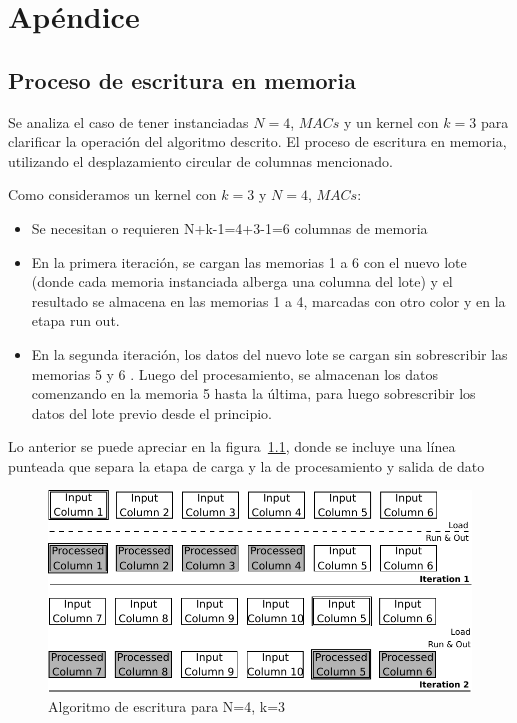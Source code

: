 \chapter{Apéndice}
\section{Proceso de escritura en memoria}  \label{writing_subsecc}

Se analiza el caso de tener instanciadas $N=4$, $MACs$ y un kernel con $k=3$
para clarificar la operación del algoritmo descrito. El proceso de escritura en
memoria, utilizando el desplazamiento circular de columnas mencionado.

Como consideramos un kernel con $k=3$ y $N=4$, $MACs$:
	    
\begin{itemize}
\item Se necesitan o requieren N+k-1=4+3-1=6 columnas de memoria
\item En la primera iteración, se cargan las memorias 1 a 6 con el nuevo lote
  (donde cada memoria instanciada alberga una columna del lote) y el resultado
  se almacena en las memorias 1 a 4, marcadas con otro color y en la etapa run
  out.
\item En la segunda iteración, los datos del nuevo lote se cargan sin
  sobrescribir las memorias 5 y 6 . Luego del procesamiento, se almacenan los
  datos comenzando en la memoria  5 hasta la última, para luego sobrescribir los
  datos del lote previo desde el principio.
\end{itemize}

Lo anterior se puede apreciar en la figura~\ref{writingprocess1}, donde se
incluye una línea punteada que separa la etapa de carga y la de procesamiento y
salida de dato

\begin{figure}
\centering
\includegraphics[scale=0.8]{algorithm}
\caption{Algoritmo de escritura para N=4, k=3 }
\label{writingprocess1}
\end{figure}

